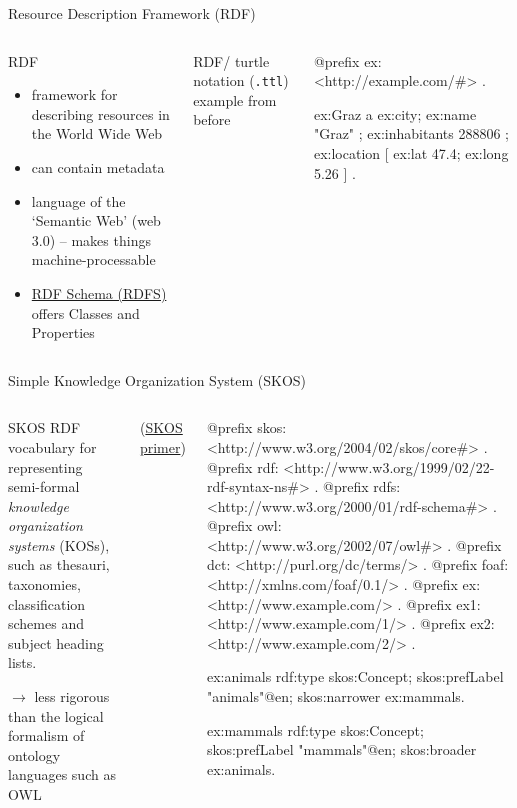 \begin{frame}[fragile]{Resource Description Framework (RDF)}
\begin{columns}
\begin{block}{RDF}
\begin{itemize}\small
\item framework for describing resources in the World Wide Web
\item can contain metadata
\item language of the `Semantic Web' (web 3.0) -- makes things machine-processable
\item \href{https://www.w3.org/TR/rdf-schema/}{RDF Schema (RDFS)} offers Classes and Properties
\end{itemize}
\end{block}
RDF/ turtle notation (\texttt{.ttl}) example from before
\begin{turtlecode}
@prefix ex: <http://example.com/#> .

ex:Graz a ex:city;  
ex:name "Graz" ; 
ex:inhabitants 288806 ; 
ex:location [ ex:lat 47.4; ex:long 5.26 ] .
\end{turtlecode}
\end{columns}
\end{frame}

\begin{frame}[fragile]{Simple Knowledge Organization System (SKOS)}
\begin{columns}
\begin{block}{SKOS}\footnotesize
RDF vocabulary for representing semi-formal \emph{knowledge organization systems} (KOSs), such as thesauri, taxonomies, classification schemes and subject heading lists.

$\to$ less rigorous than the logical formalism of ontology languages such as OWL
\end{block}
(\href{https://www.w3.org/TR/skos-primer}{SKOS primer})
\begin{turtlecode}
@prefix skos: 
  <http://www.w3.org/2004/02/skos/core#> .
@prefix rdf: 
  <http://www.w3.org/1999/02/22-rdf-syntax-ns#> .
@prefix rdfs: 
  <http://www.w3.org/2000/01/rdf-schema#> .
@prefix owl: <http://www.w3.org/2002/07/owl#> .
@prefix dct: <http://purl.org/dc/terms/> .
@prefix foaf: <http://xmlns.com/foaf/0.1/> .
@prefix ex: <http://www.example.com/> .
@prefix ex1: <http://www.example.com/1/> .
@prefix ex2: <http://www.example.com/2/> .

ex:animals rdf:type skos:Concept;
  skos:prefLabel "animals"@en;
  skos:narrower ex:mammals.
  
ex:mammals rdf:type skos:Concept;
  skos:prefLabel "mammals"@en;
  skos:broader ex:animals.
\end{turtlecode}
\end{columns}
\end{frame}

